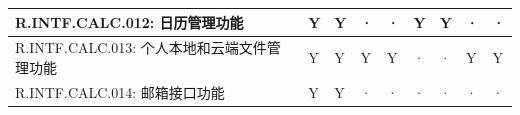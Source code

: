 \begin{table}[htbp]
\begin{tabular}{|p{9em}|p{2.5em}|p{2.5em}|p{2.5em}|p{2.5em}|p{2.5em}|
                            p{2.5em}|p{2.5em}|p{2.5em}|}
            \hline %
            R.INTF.CALC.012: 日历管理功能
                & Y                     & Y                 & · 
                & ·                     & Y                 & Y 
                & ·                     & ·                 \\
            \hline %
            R.INTF.CALC.013: 个人本地和云端文件管理功能
                & Y                     & Y                 & Y 
                & Y                     & ·                 & · 
                & Y                     & Y                 \\
            \hline %
            R.INTF.CALC.014: 邮箱接口功能
                & Y                     & Y                 & · 
                & ·                     & ·                 & · 
                & ·                     & ·                 \\
            \hline %
            \end{tabular}
    \end{table}
